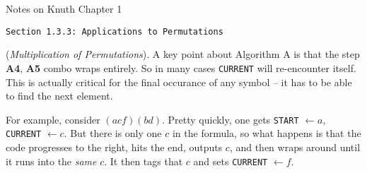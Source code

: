 \topglue 0.5in
\centerline{Notes on Knuth Chapter 1}
\vskip 0.5in
\centerline{\tt Section 1.3.3: Applications to Permutations}
\vskip 0.2in

 ({\it Multiplication of Permutations}). \hfil\break
A key point about Algorithm A is that the step {\bf A4},
{\bf A5} combo wraps entirely.  So in many cases {\tt CURRENT} will
re-encounter itself.  This is actually critical for the final occurance of
any symbol -- it has to be able to find the next element.  

For example,
consider $\left(a c f\right)\left(b d\right)$.  Pretty quickly, one gets
{\tt START} $\gets a$, {\tt CURRENT} $\gets c$.  But there is only one $c$
in the formula, so what happens is that the code progresses to the right,
hits the end, outputs $c$, and then wraps around until it runs into the 
{\it same} $c$.  It then tags that $c$ and sets {\tt CURRENT} $\gets f$.

